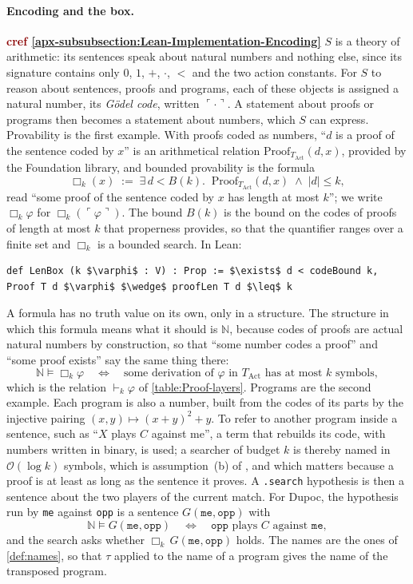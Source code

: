 \documentclass[twoside,11pt]{article}
\newcommand{\boldred}[1]{\textbf{\textcolor{darkred}{#1}}}
\begin{document}
\paragraph{Encoding and the box.} \boldred{cref \cref{apx-subsubsection:Lean-Implementation-Encoding}} $S$ is a theory of arithmetic: its sentences speak about natural numbers and nothing else, since its signature contains only $0$, $1$, $+$, $\cdot$, $<$ and the two action constants. For $S$ to reason about sentences, proofs and programs, each of these objects is assigned a natural number, its \emph{G\"odel code}, written $\ulcorner\cdot\urcorner$. A statement about proofs or programs then becomes a statement about numbers, which $S$ can express. Provability is the first example. With proofs coded as numbers, \enquote{$d$ is a proof of the sentence coded by $x$} is an arithmetical relation $\mathrm{Proof}_{T_{\mathrm{Act}}}(d, x)$, provided by the Foundation library, and bounded provability is the formula
\[
  \Box_k(x) \;:=\; \exists\, d < B(k).\;\; \mathrm{Proof}_{T_{\mathrm{Act}}}(d, x) \;\wedge\; |d| \le k ,
\]
read \enquote{some proof of the sentence coded by $x$ has length at most $k$}; we write $\Box_k\varphi$ for $\Box_k(\ulcorner\varphi\urcorner)$. The bound $B(k)$ is the bound on the codes of proofs of length at most $k$ that properness provides, so that the quantifier ranges over a finite set and $\Box_k$ is a bounded search. In Lean:
\begin{lstlisting}[style=pdlean, mathescape=true]
def LenBox (k $\varphi$ : V) : Prop := $\exists$ d < codeBound k, Proof T d $\varphi$ $\wedge$ proofLen T d $\leq$ k
\end{lstlisting}
A formula has no truth value on its own, only in a structure. The structure in which this formula means what it should is $\mathbb{N}$, because codes of proofs are actual natural numbers by construction, so that \enquote{some number codes a proof} and \enquote{some proof exists} say the same thing there:
\[
  \mathbb{N} \models \Box_k\varphi \quad\Longleftrightarrow\quad \text{some derivation of } \varphi \text{ in } T_{\mathrm{Act}} \text{ has at most } k \text{ symbols},
\]
which is the relation $\vdash_k\varphi$ of \cref{table:Proof-layers}. Programs are the second example. Each program is also a number, built from the codes of its parts by the injective pairing $(x,y) \mapsto (x+y)^2 + y$. To refer to another program inside a sentence, such as \enquote{$X$ plays $C$ against me}, a term that rebuilds its code, with numbers written in binary, is used; a searcher of budget $k$ is thereby named in $\mathcal{O}(\log k)$ symbols, which is assumption~(b) of \citet[Appendix B]{Critch}, and which matters because a proof is at least as long as the sentence it proves. A \texttt{.search} hypothesis is then a sentence about the two players of the current match. For Dupoc, the hypothesis run by \texttt{me} against \texttt{opp} is a sentence $G(\texttt{me},\texttt{opp})$ with
\[
  \mathbb{N} \models G(\texttt{me}, \texttt{opp}) \quad\Longleftrightarrow\quad \texttt{opp} \text{ plays } C \text{ against } \texttt{me},
\]
and the search asks whether $\Box_k\, G(\texttt{me},\texttt{opp})$ holds. The names are the ones of \cref{def:names}, so that $\tau$ applied to the name of a program gives the name of the transposed program.
\end{document}
